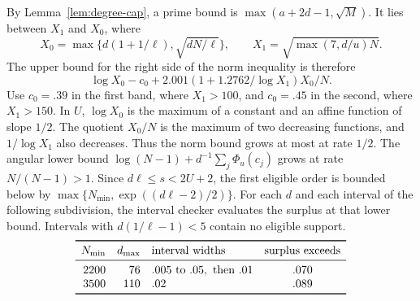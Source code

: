 By Lemma~\ref{lem:degree-cap}, a prime bound is
\(\max(a+2d-1,\sqrt M)\). It lies between \(X_1\) and \(X_0\),
where
\[
 X_0=\max\{d(1+1/\ell),\sqrt{dN/\ell}\},\qquad
 X_1=\sqrt{\max(7,d/u)N}.
\]
The upper bound for the right side of the norm inequality is therefore
\begin{equation}\label{eq:moderate-norm}
 \log X_0-c_0+2.001(1+1.2762/\log X_1)X_0/N.
\end{equation}
Use \(c_0=.39\) in the first band, where \(X_1>100\), and
\(c_0=.45\) in the second, where \(X_1>150\).
In \(U\), \(\log X_0\) is the maximum of a constant and an
affine function of slope \(1/2\). The quotient \(X_0/N\) is
the maximum of two decreasing functions, and \(1/\log X_1\)
also decreases. Thus the norm bound grows at most at rate
\(1/2\). The angular lower bound
\(\log(N-1)+d^{-1}\sum_j\Phi_u(c_j)\) grows at rate \(N/(N-1)>1\).
Since \(d\ell\le s<2U+2\), the first eligible order is
bounded below by \(\max\{N_{\min},\exp((d\ell-2)/2)\}\).
For each \(d\) and each interval of the following subdivision,
the interval checker evaluates the surplus at that lower bound.
Intervals with \(d(1/\ell-1)<5\) contain no eligible support.
\[
\begin{array}{rrlc}
\toprule
N_{\min}&d_{\max}&\text{interval widths}&\text{surplus exceeds}\\
\midrule
2200 &76 & .005\text{ to } .05,\ \text{then } .01 &.070\\
3500 &110& .02 &.089\\
\bottomrule
\end{array}
\]

